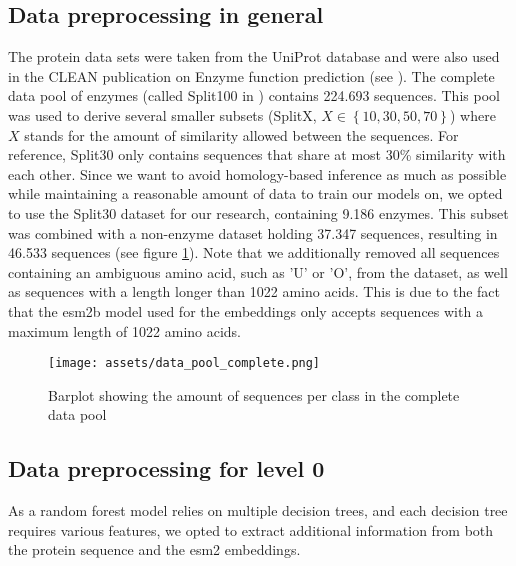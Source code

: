 \documentclass{bioinfo}
\begin{document}
\begin{methods}
\subsection{Data preprocessing in general}

The protein data sets were taken from the UniProt database and were also used in the CLEAN publication on Enzyme function prediction (see \cite{CleanArticle}). 
The complete data pool of enzymes (called Split100 in \cite{CLEANgit}) contains 224.693 sequences. 
This pool was used to derive several smaller subsets (SplitX, $X \in \left\{10, 30, 50, 70\right\}$) where $X$ stands for the amount of similarity allowed between the sequences.
For reference, Split30 only contains sequences that share at most 30\% similarity with each other.
Since we want to avoid homology-based inference as much as possible while 
maintaining a reasonable amount of data to train our models on, we opted to use the Split30 dataset for our research,
containing 9.186 enzymes. This subset was combined with a non-enzyme dataset holding 37.347 sequences, resulting in 46.533 sequences (see figure \ref{fig:DataPoolDist}).
Note that we additionally removed all sequences containing an ambiguous amino acid, such as 'U' or 'O', from the dataset, as well as
sequences with a length longer than 1022 amino acids. 
This is due to the fact that the esm2b model used for the embeddings only accepts sequences 
with a maximum length of 1022 amino acids. %

\begin{figure}[!htbp]
\texttt{[image: assets/data\_pool\_complete.png]}
\caption{Barplot showing the amount of sequences per class in the complete data pool}\label{fig:DataPoolDist}
\end{figure}

\subsection{Data preprocessing for level 0}
As a random forest model relies on multiple decision trees, and each decision tree requires various features,
we opted to extract additional information from both the protein sequence and the esm2 embeddings. %


\end{methods}
\end{document}
